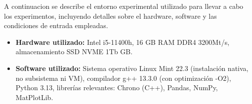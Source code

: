 A continuacion se describe el entorno experimental utilizado para llevar a cabo los experimentos, incluyendo detalles sobre el hardware, software y las condiciones de entrada empleadas.


\begin{itemize}
    \item \textbf{Hardware utilizado:} Intel i5-11400h, 16 GB RAM DDR4 3200Mt/s, almacenamiento SSD NVME 1Tb GB.
    \item \textbf{Software utilizado:} Sistema operativo Linux Mint 22.3 (instalación nativa, no subsistema ni VM), compilador g++ 13.3.0 (con optimización -O2), Python 3.13, librerías relevantes: Chrono (C++), Pandas, NumPy, MatPlotLib.
\end{itemize}



